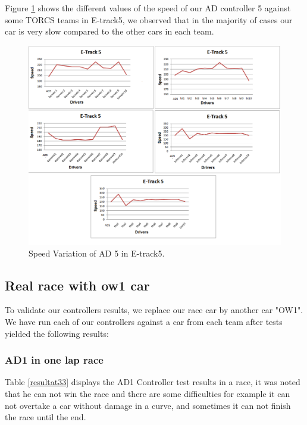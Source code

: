 \documentclass{llncs}
\begin{document}
Figure \ref{speed} shows the different values of the speed of our AD controller 5 against some TORCS teams in E-track5, we observed that in the majority of cases our car is very slow compared to the other cars in each team. \\

\begin{figure}[h!]
	
	\centering
	\includegraphics[width=1.1\textwidth]{fig/SpeedRace.PNG}
	\begin{minipage}{10cm}
		\centering
		\caption{\footnotesize Speed Variation of AD 5 in E-track5.}
		\label{speed}
	\end{minipage} 
	
	
\end{figure}
\subsection{Real race with ow1 car}
To validate our controllers results, we replace our race car by another car  "OW1". We have run each of our controllers against a car from each team after tests yielded the following results: \\	

\subsubsection{AD1 in one lap race}
Table \ref{resultat33}  displays the AD1 Controller test results in a race, it was noted that he can not win the race and there are some difficulties for example it can not  overtake a car without damage in a curve, and sometimes it can not finish the race until the end.
\end{document}

